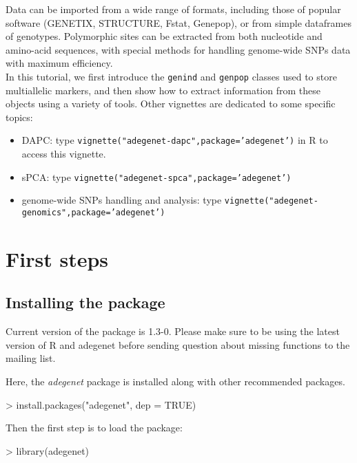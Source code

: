 \documentclass{article}
\begin{document}
Data can be imported from a wide range of formats, including those of
popular software (GENETIX, STRUCTURE, Fstat, Genepop), or from simple dataframes of genotypes.
Polymorphic sites can be extracted from both nucleotide and amino-acid sequences, with special
methods for handling genome-wide SNPs data with maximum efficiency.
\\

In this tutorial, we first introduce the \texttt{genind} and \texttt{genpop} classes used to store
multiallelic markers, and then show how to extract information from these objects using a variety of
tools.
Other vignettes are dedicated to some specific topics:
\begin{itemize}
\item DAPC: type \texttt{vignette("adegenet-dapc",package='adegenet')} in R to access this vignette.
\item sPCA: type \texttt{vignette("adegenet-spca",package='adegenet')}
\item genome-wide SNPs handling and analysis: type \texttt{vignette("adegenet-genomics",package='adegenet')}
\end{itemize}




\section{First steps}


\subsection{Installing the package}
Current version of the package is 1.3-0.
Please make sure to be using the latest version of R and adegenet
before sending question about missing functions to the mailing list.

Here, the \textit{adegenet} package is installed along with other recommended packages.
\begin{Schunk}
\begin{Sinput}
> install.packages("adegenet", dep = TRUE)
\end{Sinput}
\end{Schunk}
Then the first step is to load the package:
\begin{Schunk}
\begin{Sinput}
> library(adegenet)
\end{Sinput}
\end{Schunk}
\end{document}
